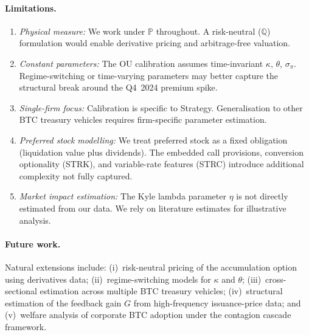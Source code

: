 \paragraph{Limitations.}
\begin{enumerate}
  \item \emph{Physical measure:} We work under $\mathbb{P}$ throughout.
    A risk-neutral ($\mathbb{Q}$) formulation would enable derivative
    pricing and arbitrage-free valuation.
  \item \emph{Constant parameters:} The OU calibration assumes
    time-invariant $\kappa$, $\theta$, $\sigma_\pi$.  Regime-switching
    or time-varying parameters may better capture the structural
    break around the Q4~2024 premium spike.
  \item \emph{Single-firm focus:} Calibration is specific to Strategy.
    Generalisation to other BTC treasury vehicles requires
    firm-specific parameter estimation.
  \item \emph{Preferred stock modelling:} We treat preferred stock as a
    fixed obligation (liquidation value plus dividends).  The embedded
    call provisions, conversion optionality (STRK), and variable-rate
    features (STRC) introduce additional complexity not fully captured.
  \item \emph{Market impact estimation:} The Kyle lambda parameter
    $\eta$ is not directly estimated from our data.  We rely on
    literature estimates for illustrative analysis.
\end{enumerate}

\paragraph{Future work.}
Natural extensions include: (i)~risk-neutral pricing of the accumulation
option using derivatives data; (ii)~regime-switching models for $\kappa$
and $\theta$; (iii)~cross-sectional estimation across multiple BTC treasury
vehicles; (iv)~structural estimation of the feedback gain $G$ from
high-frequency issuance-price data; and (v)~welfare analysis of corporate
BTC adoption under the contagion cascade framework.
